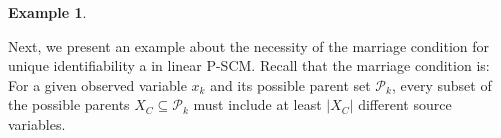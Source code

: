 \documentclass[12pt]{article}
\newtheorem{example}{Example}
\begin{document}
\begin{example}
\end{example}

Next, we present an example about the necessity of the marriage condition for unique identifiability a in linear P-SCM. Recall that the marriage condition is: For a given observed variable $x_k$ and its possible parent set $\mathcal{P}_k$, every subset of the possible parents $X_C\subseteq \mathcal{P}_k$ must include at least $|X_C|$ different source variables. %
\end{document}
